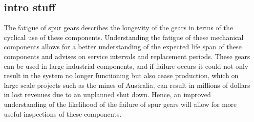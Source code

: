 \subsection{intro stuff}
The fatigue of spur gears describes the longevity of the gears in terms of the cyclical use of these components. Understanding the fatigue of these mechanical components allows for a better understanding of the expected life span of these components and advises on service intervals and replacement periods. These gears can be used in large industrial components, and if failure occurs it could not only result in the system no longer functioning but also cease production, which on large scale projects such as the mines of Australia, can result in millions of dollars in lost revenues due to an unplanned shut down. Hence, an improved understanding of the likelihood of the failure of spur gears will allow for more useful inspections of these components.  